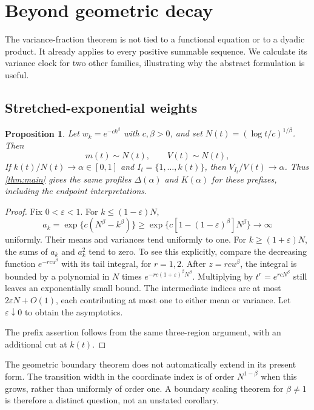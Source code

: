 \documentclass[11pt,a4paper]{article}
\numberwithin{equation}{section}
\newtheorem{proposition}[proposition]{Proposition}
\theoremstyle{definition}
\theoremstyle{remark}
\begin{document}
\section{Beyond geometric decay}
\label{sec:other-weights}
The variance-fraction theorem is not tied to a functional equation
or to a dyadic product. It already applies to every positive summable
sequence. We calculate its variance clock for two other families,
illustrating why the abstract formulation is useful.

\subsection{Stretched-exponential weights}
\begin{proposition}\label{prop:stretched}
Let $w_k=e^{-ck^\beta}$ with $c,\beta>0$, and set
$N(t)=(\log t/c)^{1/\beta}$. Then
\[
 m(t)\sim N(t),\qquad V(t)\sim N(t),
\]
If $k(t)/N(t)\to\alpha\in[0,1]$ and
$I_t=\{1,\ldots,k(t)\}$, then $V_{I_t}/V(t)\to\alpha$.
Thus \cref{thm:main} gives the same profiles $\Delta(\alpha)$
and $K(\alpha)$ for these prefixes, including the endpoint
interpretations.
\end{proposition}
\begin{proof}
Fix $0<\varepsilon<1$. For $k\le(1-\varepsilon)N$,
\[
 a_k=\exp\{c(N^\beta-k^\beta)\}
 \ge\exp\{c[1-(1-\varepsilon)^\beta]N^\beta\}\to\infty
\]
uniformly. Their means and variances tend uniformly to one.
For $k\ge(1+\varepsilon)N$, the sums of $a_k$ and $a_k^2$
tend to zero. To see this explicitly, compare the decreasing
function $e^{-rcu^\beta}$ with its tail integral, for $r=1,2$.
After $z=rcu^\beta$, the integral is bounded by a polynomial in
$N$ times $e^{-rc(1+\varepsilon)^\beta N^\beta}$.
Multiplying by $t^r=e^{rcN^\beta}$ still leaves an exponentially
small bound. The intermediate indices are at most
$2\varepsilon N+O(1)$, each contributing at most one to either
mean or variance. Let $\varepsilon\downarrow0$ to obtain the
asymptotics.

The prefix assertion follows from the same three-region argument,
with an additional cut at $k(t)$.
\end{proof}

The geometric boundary theorem does not automatically extend in
its present form. The transition width in the coordinate index is
of order $N^{1-\beta}$ when this grows, rather than uniformly of
order one. A boundary scaling theorem for $\beta\ne1$ is therefore
a distinct question, not an unstated corollary.
\end{document}
